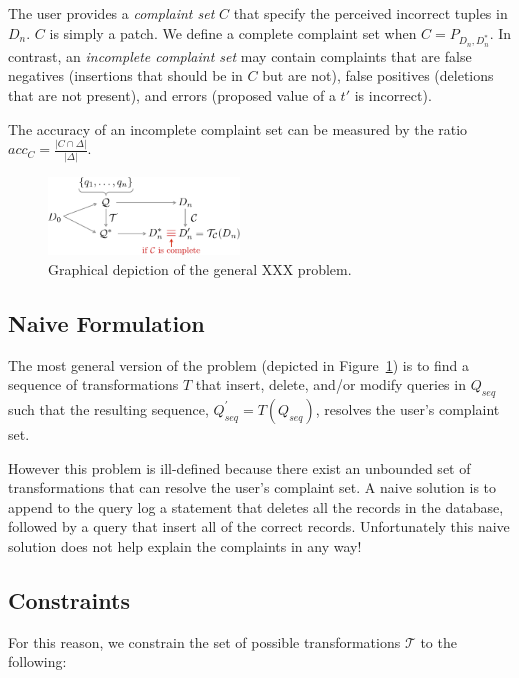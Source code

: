 The user provides a {\it complaint set} $C$ that specify the perceived incorrect tuples in $D_n$.
$C$ is simply a patch.
We define a complete complaint set when $C = P_{D_n, D^*_n}$.
In contrast, an {\it incomplete complaint set}  may contain complaints that are false negatives (insertions that should be in $C$ but are not),
false positives (deletions that are not present), and errors (proposed value of a $t'$ is incorrect).

The accuracy of an incomplete complaint set can be measured by the ratio $acc_C = \frac{|C \cap \Delta|}{|\Delta|}$.



\begin{figure}[h]
\centering
\includegraphics[width = 2in]{figures/probtransform}
\caption{Graphical depiction of the general XXX problem.}
\label{f:probtransform} 
\end{figure}



\subsection{Naive Formulation}

The most general version of the problem
(depicted in Figure~\ref{f:probtransform}) is to find a sequence of
transformations $T$ that insert, delete, and/or modify queries in $Q_{seq}$ 
such that the resulting sequence, $Q^'_{seq} = T(Q_{seq})$, resolves the user's complaint set. 

However this problem is ill-defined because there exist an unbounded set of transformations that
can resolve the user's complaint set.  A naive solution is to append to the query log a statement
that deletes all the records in the database, followed by a query that insert all of the correct records.
Unfortunately this naive solution does not help explain the complaints in any way!

\subsection{Constraints}

For this reason, we constrain the set of possible transformations $\mathcal{T}$ to the following:

